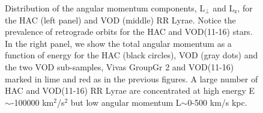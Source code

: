 \documentclass[fleqn,usenatbib]{mnras}
\begin{document}
\begin{figure}
		       	       	       	       \vspace{-0.46cm}
   \caption{Distribution of the angular momentum components,
     $\mathrm{L_{\perp}}$ and $\mathrm{L_{z}}$, for the HAC (left
     panel) and VOD (middle) RR Lyrae. Notice the prevalence of
     retrograde orbits for the HAC and VOD(11-16) stars. In the right
     panel, we show the total angular momentum as a function of energy
     for the HAC (black circles), VOD (gray dots) and the two VOD
     sub-samples, Vivas GroupGr 2 and VOD(11-16) marked in lime and red as
     in the previous figures. A large number of HAC and VOD(11-16) RR
     Lyrae are concentrated at high energy E$\sim$-100000
     km$^{2}$/s$^{2}$ but low angular momentum L$\sim$0-500 km/s kpc.}
    \label{fig:energy}
\end{figure}
%
\end{document}
